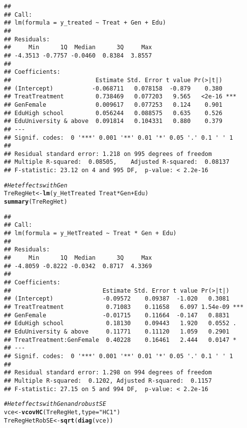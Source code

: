 \documentclass[11pt, a4paper]{article}\usepackage[]{graphicx}\usepackage[]{color}
\makeatletter
\newcommand{\hlstr}[1]{\textcolor[rgb]{0.192,0.494,0.8}{#1}}%
\newcommand{\hlcom}[1]{\textcolor[rgb]{0.678,0.584,0.686}{\textit{#1}}}%
\newcommand{\hlopt}[1]{\textcolor[rgb]{0,0,0}{#1}}%
\newcommand{\hlstd}[1]{\textcolor[rgb]{0.345,0.345,0.345}{#1}}%
\newcommand{\hlkwb}[1]{\textcolor[rgb]{0.69,0.353,0.396}{#1}}%
\newcommand{\hlkwc}[1]{\textcolor[rgb]{0.333,0.667,0.333}{#1}}%
\newcommand{\hlkwd}[1]{\textcolor[rgb]{0.737,0.353,0.396}{\textbf{#1}}}%
\newenvironment{kframe}{%
 \def\at@end@of@kframe{}%
 \ifinner\ifhmode%
  \def\at@end@of@kframe{\end{minipage}}%
  \begin{minipage}{\columnwidth}%
 \fi\fi%
 \def\FrameCommand##1{\hskip\@totalleftmargin \hskip-\fboxsep
 \colorbox{shadecolor}{##1}\hskip-\fboxsep
     \hskip-\linewidth \hskip-\@totalleftmargin \hskip\columnwidth}%
 \MakeFramed {\advance\hsize-\width
   \@totalleftmargin\z@ \linewidth\hsize
   \@setminipage}}%
 {\par\unskip\endMakeFramed%
 \at@end@of@kframe}
\newenvironment{knitrout}{}{} %
\makeatother
\begin{document}
\begin{knitrout}
\begin{kframe}
\begin{alltt}
\end{alltt}
\begin{verbatim}
## 
## Call:
## lm(formula = y_treated ~ Treat + Gen + Edu)
## 
## Residuals:
##     Min      1Q  Median      3Q     Max 
## -4.3513 -0.7757 -0.0460  0.8384  3.8557 
## 
## Coefficients:
##                        Estimate Std. Error t value Pr(>|t|)    
## (Intercept)           -0.068711   0.078158  -0.879    0.380    
## TreatTreatment         0.738469   0.077203   9.565   <2e-16 ***
## GenFemale              0.009617   0.077253   0.124    0.901    
## EduHigh school         0.056244   0.088575   0.635    0.526    
## EduUniversity & above  0.091814   0.104331   0.880    0.379    
## ---
## Signif. codes:  0 '***' 0.001 '**' 0.01 '*' 0.05 '.' 0.1 ' ' 1
## 
## Residual standard error: 1.218 on 995 degrees of freedom
## Multiple R-squared:  0.08505,	Adjusted R-squared:  0.08137 
## F-statistic: 23.12 on 4 and 995 DF,  p-value: < 2.2e-16
\end{verbatim}
\begin{alltt}
  \hlcom{#Het effects with Gen}
  \hlstd{TreRegHet} \hlkwb{<-} \hlkwd{lm}\hlstd{(y_HetTreated} \hlopt{~} \hlstd{Treat}\hlopt{*}\hlstd{Gen} \hlopt{+} \hlstd{Edu)}
  \hlkwd{summary}\hlstd{(TreRegHet)}
\end{alltt}
\begin{verbatim}
## 
## Call:
## lm(formula = y_HetTreated ~ Treat * Gen + Edu)
## 
## Residuals:
##     Min      1Q  Median      3Q     Max 
## -4.8059 -0.8222 -0.0342  0.8717  4.3369 
## 
## Coefficients:
##                          Estimate Std. Error t value Pr(>|t|)    
## (Intercept)              -0.09572    0.09387  -1.020   0.3081    
## TreatTreatment            0.71083    0.11658   6.097 1.54e-09 ***
## GenFemale                -0.01715    0.11664  -0.147   0.8831    
## EduHigh school            0.18130    0.09443   1.920   0.0552 .  
## EduUniversity & above     0.11771    0.11120   1.059   0.2901    
## TreatTreatment:GenFemale  0.40228    0.16461   2.444   0.0147 *  
## ---
## Signif. codes:  0 '***' 0.001 '**' 0.01 '*' 0.05 '.' 0.1 ' ' 1
## 
## Residual standard error: 1.298 on 994 degrees of freedom
## Multiple R-squared:  0.1202,	Adjusted R-squared:  0.1157 
## F-statistic: 27.15 on 5 and 994 DF,  p-value: < 2.2e-16
\end{verbatim}
\begin{alltt}
  \hlcom{#Het effects with Gen and robust SE}
  \hlstd{vce} \hlkwb{<-} \hlkwd{vcovHC}\hlstd{(TreRegHet,} \hlkwc{type} \hlstd{=} \hlstr{"HC1"}\hlstd{)}
  \hlstd{TreRegHetRobSE} \hlkwb{<-} \hlkwd{sqrt}\hlstd{(}\hlkwd{diag}\hlstd{(vce))}

\end{alltt}
\end{kframe}
\end{knitrout}
\end{document}
